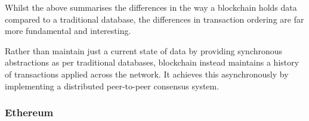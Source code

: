 Whilst the above summarises the differences in the way a blockchain holds data compared to a traditional database, the differences in transaction ordering are far more fundamental and interesting.

Rather than maintain just a current state of data by providing synchronous abstractions as per traditional databases, blockchain instead maintains a history of transactions applied across the network. It achieves this asynchronously by implementing a distributed peer-to-peer consensus system.

\subsubsection{Ethereum}






